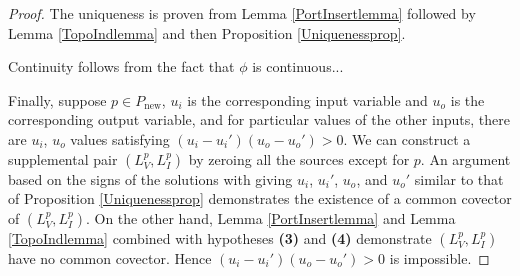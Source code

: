 \documentclass{amsproc-sunycstr}
\theoremstyle{plain}
\theoremstyle{definition}
\theoremstyle{remark}
\newcommand{\Pnew}{{P_{\mbox{new}}}}
\begin{document}
\begin{proof}
The uniqueness is proven from 
Lemma \ref{PortInsertlemma} followed by Lemma
\ref{TopoIndlemma} and then Proposition \ref{Uniquenessprop}.

Continuity follows from the fact that $\phi$ is continuous...

Finally, suppose $p\in\Pnew$, $u_i$ is the corresponding input variable
and $u_o$ is the corresponding output variable, and for particular values
of the other inputs, there are $u_i$, $u_o$ values satisfying
$(u_i-u_i')(u_o-u_o')>0$.  
We can construct a supplemental pair $(L_V^p,L_I^p)$ by zeroing
all the sources except for $p$.
An argument based on the signs of the solutions
with giving $u_i$, $u_i'$, $u_o$, and $u_o'$ similar to that of 
Proposition \ref{Uniquenessprop} demonstrates the existence of a 
common covector of $(L_V^p,L_I^p)$.
On the other hand, Lemma 
\ref{PortInsertlemma} and Lemma 
\ref{TopoIndlemma} combined with hypotheses \textbf{(3)} and \textbf{(4)}
demonstrate $(L_V^p,L_I^p)$ have no common covector.  Hence
$(u_i-u_i')(u_o-u_o')>0$ is impossible.
\end{proof}
\end{document}
